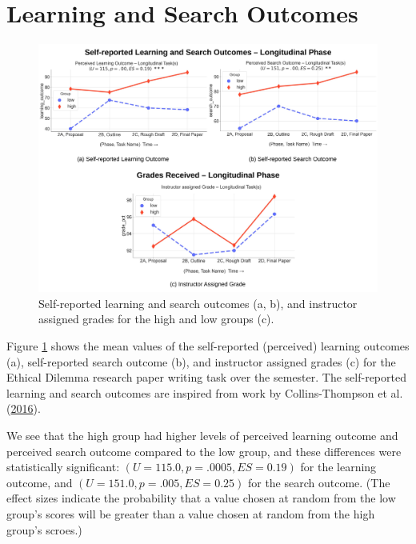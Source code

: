\documentclass[letterpaper, nobind]{templates/ociamthesis}
\begin{document}
\hypertarget{learning-and-search-outcomes}{%
\section{Learning and Search Outcomes}\label{learning-and-search-outcomes}}

\begin{figure}

{\centering \includegraphics[width=1\linewidth]{figs/rp2-learning-search-outcomes} 

}

\caption[Self-reported learning and search outcomes, and grades received in the longitudinal phase.]{Self-reported learning and search outcomes (a, b), and instructor assigned grades for the high and low groups (c).}\label{fig:rp2-learning-search-outcomes}
\end{figure}





Figure \ref{fig:rp2-learning-search-outcomes} shows the mean values of the self-reported (perceived) learning outcomes (a), self-reported search outcome (b), and instructor assigned grades (c) for the Ethical Dilemma research paper writing task over the semester.
The self-reported learning and search outcomes are inspired from work by Collins-Thompson et al. (\protect\hyperlink{ref-collins2016assessing}{2016}).

We see that the high group had higher levels of perceived learning outcome and perceived search outcome compared to the low group, and these differences were statistically significant: \((U = 115.0, p = .0005, ES = 0.19)\) for the learning outcome, and \((U = 151.0, p = .005, ES = 0.25)\) for the search outcome.
(The effect sizes indicate the probability that a value chosen at random from the low group's scores will be greater than a value chosen at random from the high group's scroes.)
\end{document}
